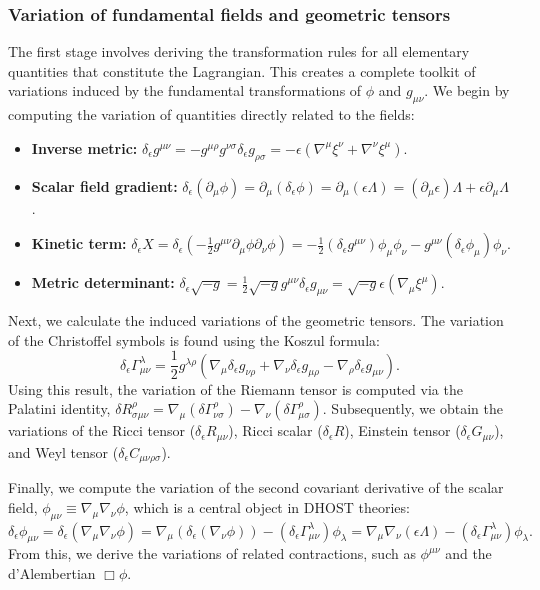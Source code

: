 \documentclass[twocolumn]{aastex631}
\begin{document}
\subsubsection{Variation of fundamental fields and geometric tensors}
The first stage involves deriving the transformation rules for all elementary quantities that constitute the Lagrangian. This creates a complete toolkit of variations induced by the fundamental transformations of $\phi$ and $g_{\mu\nu}$. We begin by computing the variation of quantities directly related to the fields:
\begin{itemize}
    \item \textbf{Inverse metric:} $\delta_\epsilon g^{\mu\nu} = -g^{\mu\rho}g^{\nu\sigma}\delta_\epsilon g_{\rho\sigma} = -\epsilon(\nabla^\mu\xi^\nu + \nabla^\nu\xi^\mu)$.
    \item \textbf{Scalar field gradient:} $\delta_\epsilon(\partial_\mu \phi) = \partial_\mu(\delta_\epsilon \phi) = \partial_\mu(\epsilon\Lambda) = (\partial_\mu\epsilon)\Lambda + \epsilon\partial_\mu\Lambda$.
    \item \textbf{Kinetic term:} $\delta_\epsilon X = \delta_\epsilon(-\frac{1}{2}g^{\mu\nu}\partial_\mu\phi\partial_\nu\phi) = -\frac{1}{2}(\delta_\epsilon g^{\mu\nu})\phi_\mu\phi_\nu - g^{\mu\nu}(\delta_\epsilon\phi_\mu)\phi_\nu$.
    \item \textbf{Metric determinant:} $\delta_\epsilon \sqrt{-g} = \frac{1}{2}\sqrt{-g}g^{\mu\nu}\delta_\epsilon g_{\mu\nu} = \sqrt{-g} \epsilon (\nabla_\mu \xi^\mu)$.
\end{itemize}
Next, we calculate the induced variations of the geometric tensors. The variation of the Christoffel symbols is found using the Koszul formula:
\begin{equation}
    \delta_\epsilon \Gamma^\lambda_{\mu\nu} = \frac{1}{2} g^{\lambda\rho} (\nabla_\mu \delta_\epsilon g_{\nu\rho} + \nabla_\nu \delta_\epsilon g_{\mu\rho} - \nabla_\rho \delta_\epsilon g_{\mu\nu}).
\end{equation}
Using this result, the variation of the Riemann tensor is computed via the Palatini identity, $\delta R^\rho_{\sigma\mu\nu} = \nabla_\mu(\delta \Gamma^\rho_{\nu\sigma}) - \nabla_\nu(\delta \Gamma^\rho_{\mu\sigma})$. Subsequently, we obtain the variations of the Ricci tensor ($\delta_\epsilon R_{\mu\nu}$), Ricci scalar ($\delta_\epsilon R$), Einstein tensor ($\delta_\epsilon G_{\mu\nu}$), and Weyl tensor ($\delta_\epsilon C_{\mu\nu\rho\sigma}$).

Finally, we compute the variation of the second covariant derivative of the scalar field, $\phi_{\mu\nu} \equiv \nabla_\mu\nabla_\nu \phi$, which is a central object in DHOST theories:
\begin{equation}
    \delta_\epsilon \phi_{\mu\nu} = \delta_\epsilon (\nabla_\mu\nabla_\nu \phi) = \nabla_\mu(\delta_\epsilon(\nabla_\nu\phi)) - (\delta_\epsilon \Gamma^\lambda_{\mu\nu})\phi_\lambda = \nabla_\mu\nabla_\nu(\epsilon\Lambda) - (\delta_\epsilon \Gamma^\lambda_{\mu\nu})\phi_\lambda.
\end{equation}
From this, we derive the variations of related contractions, such as $\phi^{\mu\nu}$ and the d'Alembertian $\Box\phi$.
\end{document}
